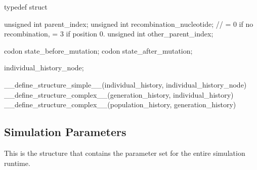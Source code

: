 \documentclass{article}
\begin{document}
\begin{ccode}
typedef struct {
  unsigned int parent_index;
  unsigned int recombination_nucleotide;  // = 0 if no recombination, = 3 if position 0.
  unsigned int other_parent_index;

  codon	state_before_mutation;
  codon state_after_mutation;
} individual_history_node;

__define_structure_simple__(individual_history, individual_history_node)
__define_structure_complex__(generation_history, individual_history)
__define_structure_complex__(population_history, generation_history)
\end{ccode}

    \subsection{Simulation Parameters}
      \label{sec:simulation-parameters}

      This is the structure that contains the parameter set for the entire
      simulation runtime.
\end{document}
